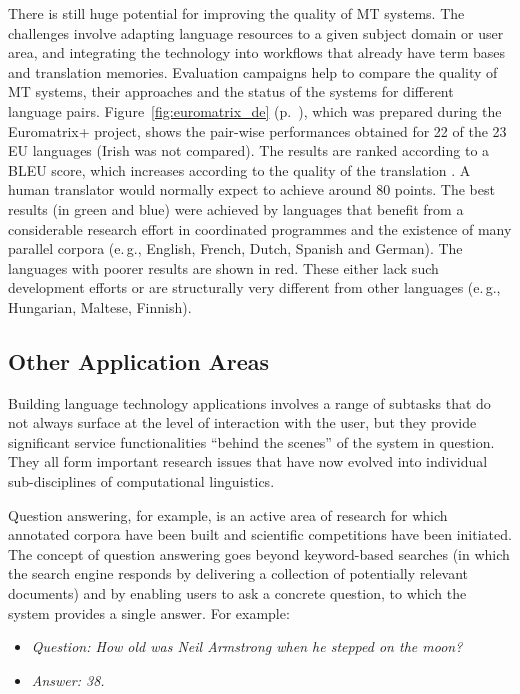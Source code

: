 \begin{multicols}{2}
There is still huge potential for improving the quality of MT systems. The challenges involve adapting language resources to a given subject domain or user area, and integrating the technology into workflows that already have term bases and translation memories. Evaluation campaigns help to compare the quality of MT systems, their approaches and the status of the systems for different language pairs. Figure~\ref{fig:euromatrix_de} (p.~\pageref{fig:euromatrix_de}), which was prepared during the Euromatrix+ project, shows the pair-wise performances obtained for 22 of the 23 EU languages (Irish was not compared). The results are ranked according to a BLEU score, which increases according to the quality of the translation \cite{bleu1}. A human translator would normally expect to achieve around 80 points. The best results (in green and blue) were achieved by languages that benefit from a considerable research effort in coordinated programmes and the existence of many parallel corpora (e.\,g., English, French, Dutch, Spanish and German). The languages with poorer results are shown in red. These either lack such development efforts or are structurally very different from other languages (e.\,g., Hungarian, Maltese, Finnish).

\subsection{Other Application Areas}

Building language technology applications involves a range of subtasks that do not always surface at the level of interaction with the user, but they provide significant service functionalities “behind the scenes” of the system in question. They all form important research issues that have now evolved into individual sub-disciplines of computational linguistics. 

Question answering, for example, is an active area of research for which annotated corpora have been built and scientific competitions have been initiated. The concept of question answering goes beyond keyword-based searches (in which the search engine responds by delivering a collection of potentially relevant documents) and by enabling users to ask a concrete question, to which the system provides a single answer. For example:

\begin{itemize}
\item[] \textit{Question: How old was Neil Armstrong when he stepped on the moon?}
\item[] \textit{Answer: 38.}
\end{itemize}


\end{multicols}
